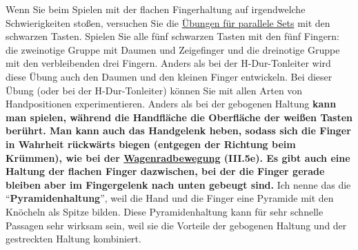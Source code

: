Wenn Sie beim Spielen mit der flachen Fingerhaltung auf irgendwelche Schwierigkeiten stoßen, versuchen Sie die \hyperref[c1iii7b]{Übungen für parallele Sets} mit den schwarzen Tasten.
Spielen Sie alle fünf schwarzen Tasten mit den fünf Fingern: die zweinotige Gruppe mit Daumen und Zeigefinger und die dreinotige Gruppe mit den verbleibenden drei Fingern.
Anders als bei der H-Dur-Tonleiter wird diese Übung auch den Daumen und den kleinen Finger entwickeln.
Bei dieser Übung (oder bei der H-Dur-Tonleiter) können Sie mit allen Arten von Handpositionen experimentieren.
Anders als bei der gebogenen Haltung \textbf{kann man spielen, während die Handfläche die Oberfläche der weißen Tasten berührt.
Man kann auch das Handgelenk heben, sodass sich die Finger in Wahrheit rückwärts biegen (entgegen der Richtung beim Krümmen), wie bei der \hyperref[c1iii5wagen]{Wagenradbewegung} (III.5e).
Es gibt auch eine Haltung der flachen Finger dazwischen, bei der die Finger gerade bleiben aber im Fingergelenk nach unten gebeugt sind.}
Ich nenne das die \enquote{\textbf{Pyramidenhaltung}}, weil die Hand und die Finger eine Pyramide mit den Knöcheln als Spitze bilden.
Diese Pyramidenhaltung kann für sehr schnelle Passagen sehr wirksam sein, weil sie die Vorteile der gebogenen Haltung und der gestreckten Haltung kombiniert.

